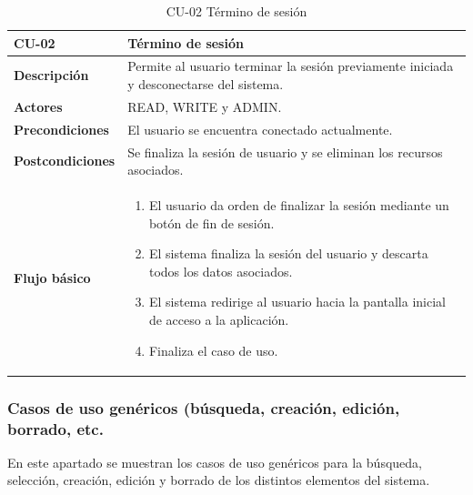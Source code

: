 \begin{table} [H]
    \centering
    \setlength{\leftmargini}{0.4cm}
	\resizebox{15cm}{!} { %
    \begin{tabular}{| m{3cm} | m{12cm} |}   
    \hline
	  \textbf{CU-02} & \textbf{Término de sesión} \\\hline
	  \textbf{Descripción} & Permite al usuario terminar la sesión previamente iniciada y desconectarse del sistema. \\\hline
	  \textbf{Actores} & READ, WRITE y ADMIN. \\\hline
	  \textbf{Precondiciones} & El usuario se encuentra conectado actualmente. \\\hline
	  \textbf{Postcondiciones} & Se finaliza la sesión de usuario y se eliminan los recursos asociados. \\\hline
	  \textbf{Flujo básico} & 
		\begin{enumerate}
	  	\item El usuario da orden de finalizar la sesión mediante un botón de fin de sesión.
		\item El sistema finaliza la sesión del usuario y descarta todos los datos asociados.
	  	\item El sistema redirige al usuario hacia la pantalla inicial de acceso a la aplicación.		  
	   	\item Finaliza el caso de uso.
	  \end{enumerate} 	  	  
	  \\\hline
    \end{tabular}
    } %
    \caption{CU-02 Término de sesión}
    \label{tab:cu-fin-sesion}
\end{table}




\subsubsection{Casos de uso genéricos (búsqueda, creación, edición, borrado, etc.} 
\label{sub:cu-genericos}

En este apartado se muestran los casos de uso genéricos para la búsqueda, selección, creación, edición y borrado de los distintos elementos del sistema.


